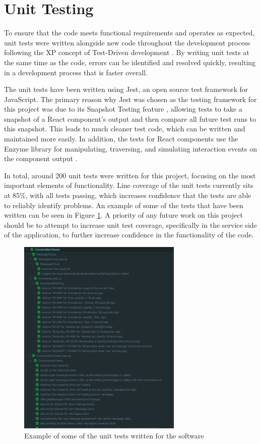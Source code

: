 \section{Unit Testing}
To ensure that the code meets functional requirements and operates as expected, unit tests were written alongside new code throughout the development process following the XP concept of Test-Driven development \cite{beck2000extreme}. By writing unit tests at the same time as the code, errors can be identified and resolved quickly, resulting in a development process that is faster overall.

The unit tests have been written using Jest, an open source test framework for JavaScript. The primary reason why Jest was chosen as the testing framework for this project was due to its Snapshot Testing feature \cite{jest-snapshot}, allowing tests to take a snapshot of a React component's output and then compare all future test runs to this snapshot. This leads to much cleaner test code, which can be written and maintained more easily. In addition, the tests for React components use the Enzyme library for manipulating, traversing, and simulating interaction events on the component output \cite{enzyme}. 

In total, around 200 unit tests were written for this project, focusing on the most important elements of functionality. Line coverage of the unit tests currently sits at 85\%, with all tests passing, which increases confidence that the tests are able to reliably identify problems. An example of some of the tests that have been written can be seen in Figure \ref{fig:test-results}. A priority of any future work on this project should be to attempt to increase unit test coverage, specifically in the service side of the application, to further increase confidence in the functionality of the code.

\begin{figure}[h!]
  \centering
  \includegraphics[width=0.7\textwidth]{images/test-results2.png}
  \caption{Example of some of the unit tests written for the software}
  \label{fig:test-results}
\end{figure}

